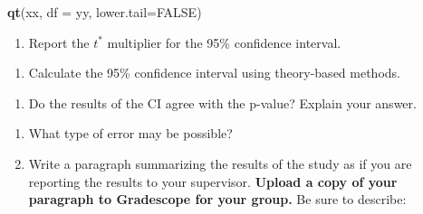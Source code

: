 \documentclass[
]{report}
\newenvironment{Shaded}{\begin{snugshade}}{\end{snugshade}}
\newcommand{\AttributeTok}[1]{\textcolor[rgb]{0.13,0.29,0.53}{#1}}
\newcommand{\ConstantTok}[1]{\textcolor[rgb]{0.56,0.35,0.01}{#1}}
\newcommand{\FunctionTok}[1]{\textcolor[rgb]{0.13,0.29,0.53}{\textbf{#1}}}
\newcommand{\NormalTok}[1]{#1}
\providecommand{\tightlist}{%
  \setlength{\itemsep}{0pt}\setlength{\parskip}{0pt}}
\begin{document}
\begin{Shaded}
\begin{Highlighting}[]
\FunctionTok{qt}\NormalTok{(xx, }\AttributeTok{df =}\NormalTok{ yy, }\AttributeTok{lower.tail=}\ConstantTok{FALSE}\NormalTok{)}
\end{Highlighting}
\end{Shaded}

\begin{enumerate}
\def\labelenumi{\arabic{enumi}.}
\setcounter{enumi}{12}
\tightlist
\item
  Report the \(t^*\) multiplier for the 95\% confidence interval.
\end{enumerate}

\vspace{0.3in}

\begin{enumerate}
\def\labelenumi{\arabic{enumi}.}
\setcounter{enumi}{13}
\tightlist
\item
  Calculate the 95\% confidence interval using theory-based methods.
\end{enumerate}

\vspace{0.5in}

\begin{enumerate}
\def\labelenumi{\arabic{enumi}.}
\setcounter{enumi}{14}
\tightlist
\item
  Do the results of the CI agree with the p-value? Explain your answer.
\end{enumerate}

\vspace{0.5in}

\begin{enumerate}
\def\labelenumi{\arabic{enumi}.}
\setcounter{enumi}{15}
\item
  What type of error may be possible?
  \vspace{0.2in}
\item
  Write a paragraph summarizing the results of the study as if you are reporting the results to your supervisor. \textbf{Upload a copy of your paragraph to Gradescope for your group.} Be sure to describe:
\end{enumerate}
\end{document}
